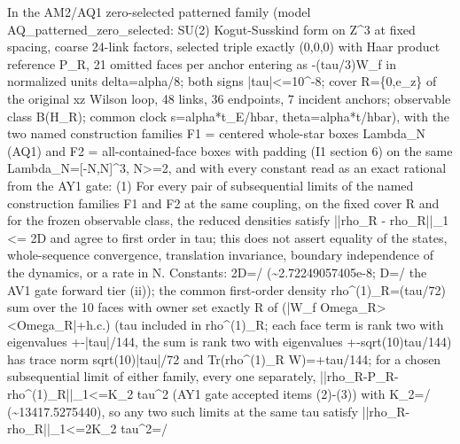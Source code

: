 \begin{gatequote}
In the AM2/AQ1 zero-selected patterned family (model
AQ\_patterned\_zero\_selected: SU(2) Kogut-Susskind form on
Z\textasciicircum{}3 at fixed spacing, coarse 24-link factors, selected triple
exactly (0,0,0) with Haar product reference P\_R, 21 omitted faces per anchor
entering as -(tau/3)W\_f in normalized units delta=alpha/8; both signs
|tau|<=10\textasciicircum{}-8; cover R=\{0,e\_z\} of the original xz Wilson
loop, 48 links, 36 endpoints, 7 incident anchors; observable class B(H\_R);
common clock s=alpha*t\_E/hbar, theta=alpha*t/hbar), with the two named
construction families F1 = centered whole-star boxes Lambda\_N (AQ1) and F2 =
all-contained-face boxes with padding (I1 section 6) on the same
Lambda\_N=[-N,N]\textasciicircum{}3, N>=2, and with every constant read as an
exact rational from the AY1 gate: (1) For every pair of subsequential limits
of the named construction families F1 and F2 at the same coupling, on the
fixed cover R and for the frozen observable class, the reduced densities
satisfy ||rho\_R - rho\textquotesingle{}\_R||\_1 <= 2D and agree to first
order in tau; this does not assert equality of the states, whole-sequence
convergence, translation invariance, boundary independence of the dynamics, or
a rate in N. Constants: 2D=/ (\textasciitilde{}2.72249057405e-8;
D=/ the AV1 gate forward tier (ii)); the
common first-order density rho\textasciicircum{}(1)\_R=(tau/72) sum over the
10 faces with owner set exactly R of (|W\_f Omega\_R><Omega\_R|+h.c.) (tau
included in rho\textasciicircum{}(1)\_R; each face term is rank two with
eigenvalues +-|tau|/144, the sum is rank two with eigenvalues
+-sqrt(10)tau/144) has trace norm sqrt(10)|tau|/72 and
Tr(rho\textasciicircum{}(1)\_R W)=+tau/144; for a chosen subsequential limit
of either family, every one separately,
||rho\_R-P\_R-rho\textasciicircum{}(1)\_R||\_1<=K\_2\textquotesingle{}
tau\textasciicircum{}2 (AY1 gate accepted items (2)-(3)) with
K\_2\textquotesingle{}=/
(\textasciitilde{}13417.5275440), so any two such limits at the same tau
satisfy ||rho\_R-rho\textquotesingle{}\_R||\_1<=2K\_2\textquotesingle{}
tau\textasciicircum{}2=/\allowbreak

\end{gatequote}
